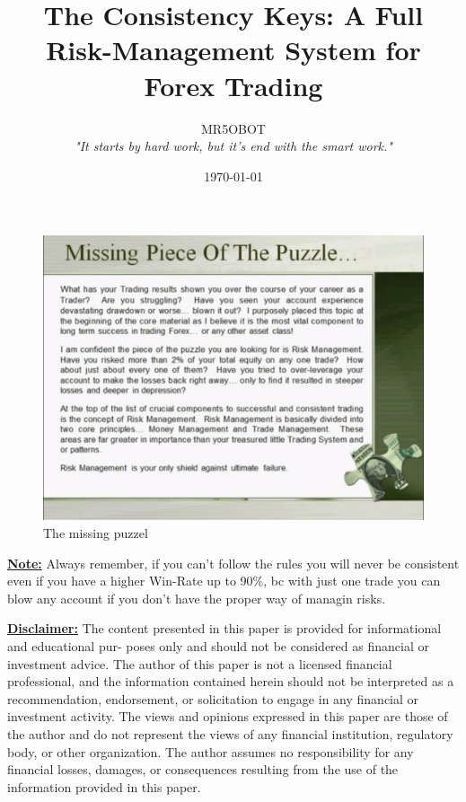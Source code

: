 \documentclass[] {article}
\title{The Consistency Keys: A  Full Risk-Management System for Forex Trading}
\author{MR5OBOT \\ \textit{"It starts by hard work, but it's end with the smart work."}}
\begin{document}
\date{\today}
\maketitle
\pagestyle{fancy}
\tableofcontents 
\newpage


\begin{figure}[h]
    \centering
    \includegraphics[width=1\textwidth]{./assets/the_missing_puzzel.jpg}
    \caption{The missing puzzel}
    \label{fig:puzzel}
\end{figure}

\vspace{0.5cm}

\noindent \textbf{\underline{Note:}}
\small{Always remember, if you can't follow the rules you will never be consistent even if you have a higher Win-Rate up to 90\%, bc with just one trade you can blow any account if you don't have the proper way of managin risks.
}

\vspace{1cm} %

\noindent \textbf{\underline{Disclaimer:}}
\small{The content presented in this paper is provided for informational and educational pur-
poses only and should not be considered as financial or investment advice. The author of this paper is
not a licensed financial professional, and the information contained herein should not be interpreted as
a recommendation, endorsement, or solicitation to engage in any financial or investment activity. The
views and opinions expressed in this paper are those of the author and do not represent the views of
any financial institution, regulatory body, or other organization. The author assumes no responsibility
for any financial losses, damages, or consequences resulting from the use of the information provided
in this paper.}
\end{document}
